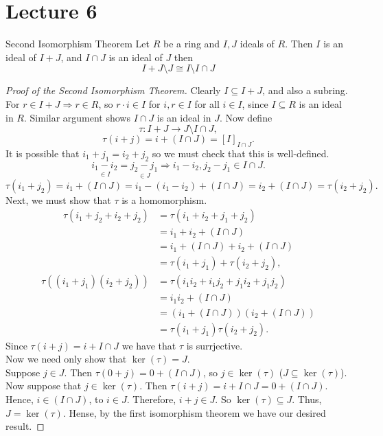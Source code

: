 \documentclass[twoside, openright, fontsize=10pt, headings=big]{scrbook}
\begin{document}
\chapter{Lecture 6}
\begin{theorem}{Second Isomorphism Theorem}{}
    Let $R$ be a ring and $I,J$ ideals of $R$. Then $I$ is an ideal of $I+J$, and $I\cap J$ is an ideal of $J$ then
    \[
        I+J\setminus J\cong I\setminus I\cap J
    \]
\end{theorem}
\begin{proof}[Proof of the Second Isomorphism Theorem]
    Clearly $I\subseteq I+J$, and also a subring. For $r\in I+J\Rightarrow r\in R$, so $r\cdot i\in I$ for $i,r\in I$ for all $i\in I$, since $I\subseteq R$ is an ideal in $R$. Similar argument shows $I\cap J$ is an ideal in $J$. Now define
    \[
        \tau:I+J\to J\setminus I\cap J,
    \]
    \[
        \tau(i+j)=i+(I\cap J)=[I]_{I\cap J}.
    \]
    It is possible that $i_1+j_1=i_2+j_2$ so we must check that this is well-defined.
    \[
        \underset{\in I}{i_1-i_2}=\underset{\in J}{j_2-j_1}\Rightarrow i_1-i_2,j_2-j_1\in I\cap J.
    \]
    \[
        \tau(i_1+j_2)=i_1+(I\cap J)=i_1-(i_1-i_2)+(I\cap J)=i_2+(I\cap J)=\tau(i_2+j_2).
    \]
    Next, we must show that $\tau$ is a homomorphism.
    \begin{align*}
        \tau(i_1+j_2+i_2+j_2)&=\tau(i_1+i_2+j_1+j_2)\\
        &=i_1+i_2+(I\cap J)\\
        &=i_1+(I\cap J)+i_2+(I\cap J)\\
        &=\tau(i_1+j_1)+\tau(i_2+j_2),
    \end{align*}
    \begin{align*}
        \tau((i_1+j_1)(i_2+j_2))&=\tau(i_1i_2+i_1j_2+j_1i_2+j_1j_2)\\
        &=i_1i_2+(I\cap J)\\
        &=(i_1+(I\cap J))(i_2+(I\cap J))\\
        &=\tau(i_1+j_1)\tau(i_2+j_2).
    \end{align*}
    Since $\tau(i+j)=i+I\cap J$ we have that $\tau$ is surrjective.\\
    Now we need only show that $\ker(\tau)=J$.\\
    Suppose $j\in J$. Then $\tau(0+j)=0+(I\cap J)$, so $j\in\ker(\tau)$ ($J\subseteq\ker(\tau)$).\\
    Now suppose that $j\in\ker(\tau)$. Then $\tau(i+j)=i+I\cap J=0+(I\cap J)$. Hence, $i\in (I\cap J)$, to $i\in J$. Therefore, $i+j\in J$. So $\ker(\tau)\subseteq J$. Thus, $J=\ker(\tau)$. Hense, by the first isomorphism theorem we have our desired result. 
\end{proof}
\end{document}
